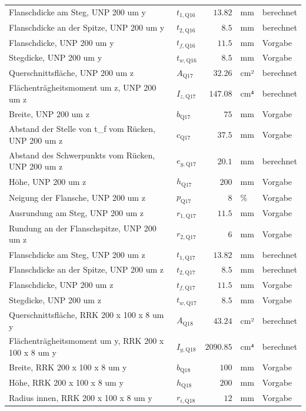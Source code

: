 \documentclass[11pt,a4paper]{article}
\begin{document}
\begin{xltabular}{\linewidth}{>{\raggedright\arraybackslash}Xlrll}
Flanschdicke am Steg, UNP 200 um y & $t_{1,\text{Q16}}$ & $13.82$ & mm & berechnet \\
Flanschdicke an der Spitze, UNP 200 um y & $t_{2,\text{Q16}}$ & $8.5$ & mm & berechnet \\
Flanschdicke, UNP 200 um y & $t_{f,\text{Q16}}$ & $11.5$ & mm & Vorgabe \\
Stegdicke, UNP 200 um y & $t_{w,\text{Q16}}$ & $8.5$ & mm & Vorgabe \\
Querschnittsfläche, UNP 200 um z & $A_{\text{Q17}}$ & $32.26$ & cm² & berechnet \\
Flächenträgheitsmoment um z, UNP 200 um z & $I_{z,\text{Q17}}$ & $147.08$ & cm⁴ & berechnet \\
Breite, UNP 200 um z & $b_{\text{Q17}}$ & $75$ & mm & Vorgabe \\
Abstand der Stelle von t\_f vom Rücken, UNP 200 um z & $c_{\text{Q17}}$ & $37.5$ & mm & Vorgabe \\
Abstand des Schwerpunkts vom Rücken, UNP 200 um z & $e_{y,\text{Q17}}$ & $20.1$ & mm & berechnet \\
Höhe, UNP 200 um z & $h_{\text{Q17}}$ & $200$ & mm & Vorgabe \\
Neigung der Flansche, UNP 200 um z & $p_{\text{Q17}}$ & $8$ & \% & Vorgabe \\
Ausrundung am Steg, UNP 200 um z & $r_{1,\text{Q17}}$ & $11.5$ & mm & Vorgabe \\
Rundung an der Flanschspitze, UNP 200 um z & $r_{2,\text{Q17}}$ & $6$ & mm & Vorgabe \\
Flanschdicke am Steg, UNP 200 um z & $t_{1,\text{Q17}}$ & $13.82$ & mm & berechnet \\
Flanschdicke an der Spitze, UNP 200 um z & $t_{2,\text{Q17}}$ & $8.5$ & mm & berechnet \\
Flanschdicke, UNP 200 um z & $t_{f,\text{Q17}}$ & $11.5$ & mm & Vorgabe \\
Stegdicke, UNP 200 um z & $t_{w,\text{Q17}}$ & $8.5$ & mm & Vorgabe \\
Querschnittsfläche, RRK 200 x 100 x 8 um y & $A_{\text{Q18}}$ & $43.24$ & cm² & berechnet \\
Flächenträgheitsmoment um y, RRK 200 x 100 x 8 um y & $I_{y,\text{Q18}}$ & $2090.85$ & cm⁴ & berechnet \\
Breite, RRK 200 x 100 x 8 um y & $b_{\text{Q18}}$ & $100$ & mm & Vorgabe \\
Höhe, RRK 200 x 100 x 8 um y & $h_{\text{Q18}}$ & $200$ & mm & Vorgabe \\
Radius innen, RRK 200 x 100 x 8 um y & $r_{i,\text{Q18}}$ & $12$ & mm & Vorgabe \\

\end{xltabular}
\end{document}
